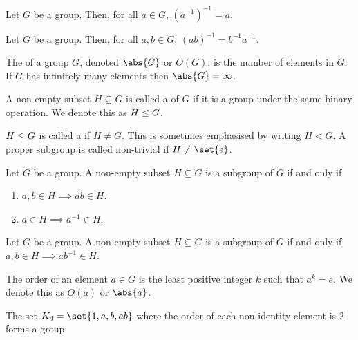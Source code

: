 \documentclass[11pt]{penrose}
\begin{document}
\begin{nthm}
    Let $G$ be a group. Then, for all $a \in G$, $(a^{-1})^{-1} = a$.
\end{nthm}

\begin{nthm}
    Let $G$ be a group. Then, for all $a, b \in G$, $(ab)^{-1} = b^{-1} a^{-1}$.
\end{nthm}

\begin{ndfn}
    The  of a group $G$, denoted $\abs{G}$ or $O(G)$, is the number of elements in $G$. If $G$ has infinitely many elements then $\abs{G} = \infty$.
\end{ndfn}

\begin{ndfn}
    A non-empty subset $H \subseteq G$ is called a  of $G$ if it is a group under the same binary operation. We denote this as $H \mathrel{\leq} G$.
\end{ndfn}

\begin{ndfn}
    $H \mathrel{\leq} G$ is called a  if $H \neq G$. This is sometimes emphasised by writing $H < G$. A proper subgroup is called non-trivial if $H \neq \set{e}$.
\end{ndfn}

\begin{nthm}
    Let $G$ be a group. A non-empty subset $H \subseteq G$ is a subgroup of $G$ if and only if
    \begin{enumerate}
        \item $a, b \in H \implies ab \in H$.
        \item $a \in H \implies a^{-1} \in H$.
    \end{enumerate}
\end{nthm}

\begin{nthm}
    Let $G$ be a group. A non-empty subset $H \subseteq G$ is a subgroup of $G$ if and only if $a, b \in H \implies ab^{-1} \in H$.
\end{nthm}

\begin{ndfn}
    The order of an element $a \in G$ is the least positive integer $k$ such that $a^k = e$. We denote this as $O(a)$ or $\abs{a}$.
\end{ndfn}

\begin{nthm}
    The set $K_4 = \set{1, a, b, ab}$ where the order of each non-identity element is $2$ forms a group.
\end{nthm}
\end{document}
